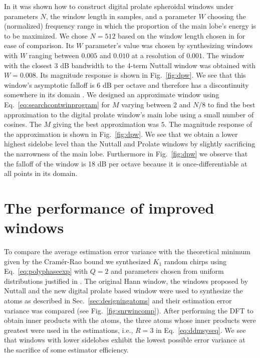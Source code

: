\documentclass[twoside,a4paper]{article}
\begin{document}
In \cite{verma1996digital} it was shown how to construct digital prolate
spheroidal windows under parameters $N$, the window length in samples, and a
parameter $W$ choosing the (normalized) frequency range in which the proportion
of the main lobe's energy is to be maximized. We chose $N=512$ based on the
window length chosen in \cite{betser2009sinusoidal} for ease of comparison. Its
$W$ parameter's value was chosen by synthesizing windows with $W$ ranging
between $0.005$ and $0.010$ at a resolution of $0.001$. The window with the
closest 3 dB bandwidth to the 4-term Nuttall window was obtained with $W=0.008$.
Its magnitude response is shown in Fig.~\ref{fig:dpw}. We see that this window's
asymptotic falloff is 6 dB per octave and therefore has a discontinuity
somewhere in its domain \cite{nuttall1981some}. We designed an approximate
window using Eq.~\ref{eq:searchcontwinprogram} for $M$ varying between $2$ and
$N/8$ to find the best approximation to the digital prolate window's main lobe
using a small number of cosines. The $M$ giving the best approximation was $5$.
The magnitude response of the approximation is shown in Fig.~\ref{fig:dpw}.  We
see that we obtain a lower highest sidelobe level than the Nuttall and Prolate
windows by slightly sacrificing the narrowness of the main lobe. Furthermore in
Fig.~\ref{fig:dpw} we observe that the falloff of the window is 18 dB per octave
because it is once-differentiable at all points in its domain.

\section{The performance of improved windows}

To compare the average estimation error variance with the
theoretical minimum given by the Cram\'{e}r-Rao bound we synthesized $K_{1}$ random
chirps using Eq.~\ref{eq:polyphaseexp}
with $Q=2$ and parameters chosen from uniform distributions justified in
\cite{betser2009sinusoidal}. The original Hann window,
the windows proposed by Nuttall and the new digital prolate based window were
used to synthesize the atoms as described in Sec.~\ref{sec:designingatoms} and
their estimation error variance was compared (see
Fig.~\ref{fig:snrwincomp}). After performing the DFT to obtain inner products
with the atoms, the three atoms whose inner products were greatest were used in
the estimations, i.e., $R=3$ in Eq.~\ref{eq:ddmsyseq}. We see that windows with
lower sidelobes exhibit the lowest possible error variance at the sacrifice of
some estimator efficiency.
\end{document}
